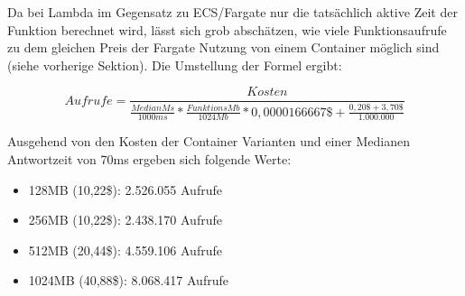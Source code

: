 Da bei Lambda im  Gegensatz zu ECS/Fargate nur die tatsächlich aktive Zeit der Funktion berechnet wird, lässt sich grob abschätzen, wie viele Funktionsaufrufe zu dem gleichen Preis der Fargate Nutzung von einem Container möglich sind (siehe vorherige Sektion). Die Umstellung der Formel ergibt:

\begin{equation}
Aufrufe = \frac{Kosten}{\frac{MedianMs}{1000ms} * \frac{FunktionsMb}{1024Mb} * 0,0000166667\$ + \frac{0,20\$ + 3,70\$}{1.000.000}}
\end{equation}

Ausgehend von den Kosten der Container Varianten und einer Medianen Antwortzeit von 70ms ergeben sich folgende Werte: 

\begin{itemize}
    \item 128MB (10,22\$): 2.526.055 Aufrufe
    \item 256MB (10,22\$): 2.438.170 Aufrufe
    \item 512MB (20,44\$): 4.559.106 Aufrufe
    \item 1024MB (40,88\$): 8.068.417 Aufrufe
\end{itemize}